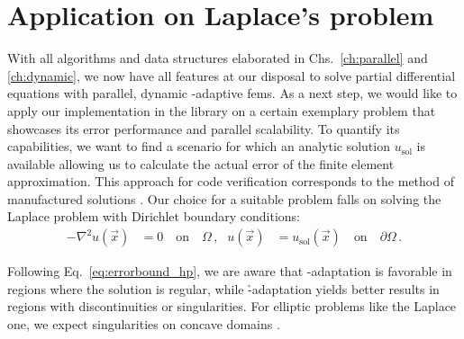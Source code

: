 \chapter{Application on Laplace's problem}
\label{ch:results}
\glsresetall


With all algorithms and data structures elaborated in Chs.~\ref{ch:parallel} and \ref{ch:dynamic}, we now have all features at our disposal to solve partial differential equations with parallel, dynamic \hp-adaptive \glspl{fem}. As a next step, we would like to apply our implementation in the \dealii{} library on a certain exemplary problem that showcases its error performance and parallel scalability. To quantify its capabilities, we want to find a scenario for which an analytic solution $u_\text{sol}$ is available allowing us to calculate the actual error of the finite element approximation. This approach for code verification corresponds to the method of manufactured solutions \parencite{salari2000}. Our choice for a suitable problem falls on solving the Laplace problem with Dirichlet boundary conditions:
\begin{align}
- \nabla^2 u(\vec{x}) &= 0 \quad\text{on}\quad \Omega \,\text{,} & u(\vec{x}) &= u_\text{sol}(\vec{x}) \quad\text{on}\quad \partial\Omega \,\text{.}
\end{align}

Following Eq.~\ref{eq:errorbound_hp}, we are aware that \p-adaptation is favorable in regions where the solution is regular, while \h-adaptation yields better results in regions with discontinuities or singularities. For elliptic problems like the Laplace one, we expect singularities on concave domains \parencite[Sec.~5.5]{brenner2008}.

